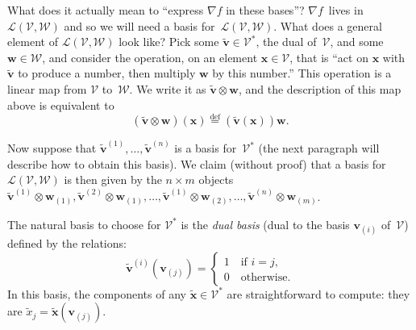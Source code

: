 \documentclass{article}
\newcommand{\isdef}{\stackrel{\text{def}}{=}}
\newcommand{\V}{\mathcal{V}}
\newcommand{\W}{\mathcal{W}}
\newcommand{\vv}[1]{\symbf{#1}}
\begin{document}
What does it actually mean to ``express $\nabla f$ in these bases''?
$\nabla f$~lives in $\mathcal{L}(\V,\W)$ and so we will need a basis
for~$\mathcal{L}(\V,\W)$.  What does a general element of
$\mathcal{L}(\V,\W)$ look like?  Pick some $\tilde{\vv{v}}\in\V^*$, the dual
of~$\V$, and some $\vv{w}\in\W$, and consider the operation, on an
element $\vv{x}\in\V$, that is ``act on $\vv{x}$ with $\tilde{\vv{v}}$
to produce a number, then multiply $\vv{w}$ by this number.''  This
operation is a linear map from $\V$ to~$\W$.  We write it as
$\tilde{\vv{v}}\otimes \vv{w}$, and the description of this map above is
equivalent to
\begin{equation*}
  (\tilde{\vv{v}}\otimes \vv{w})(\vv{x}) \isdef (\tilde{\vv{v}}(\vv{x})) \vv{w}.
\end{equation*}

Now suppose that $\tilde{\vv{v}}^{(1)}, \dotsc, \tilde{\vv{v}}^{(n)}$
is a basis for~$\V^*$ (the next paragraph will describe how to obtain
this basis).  We claim (without proof) that a basis for
$\mathcal{L}(\V,\W)$ is then given by the $n\times m$ objects
$\tilde{\vv{v}}^{(1)}\otimes \vv{w}_{(1)}, \tilde{\vv{v}}^{(2)}\otimes
\vv{w}_{(1)},\dotsc,\tilde{\vv{v}}^{(1)}\otimes \vv{w}_{(2)},\dotsc,
\tilde{\vv{v}}^{(n)}\otimes \vv{w}_{(m)}$.

The natural basis to choose for $\V^*$ is the \emph{dual basis} (dual
to the basis $\vv{v}_{(i)}$ of~$\V$) defined by the relations:
\begin{equation*}
  \tilde{\vv{v}}^{(i)} (\vv{v}_{(j)}) = \begin{cases}
    1\quad\text{if $i=j$,} \\
    0\quad\text{otherwise.}
  \end{cases}
\end{equation*}
In this basis, the components of any $\tilde{\vv{x}}\in\V^*$ are
straightforward to compute: they are $\tilde{x}_j =
\tilde{\vv{x}}(\vv{v}_{(j)})$. 
\end{document}
